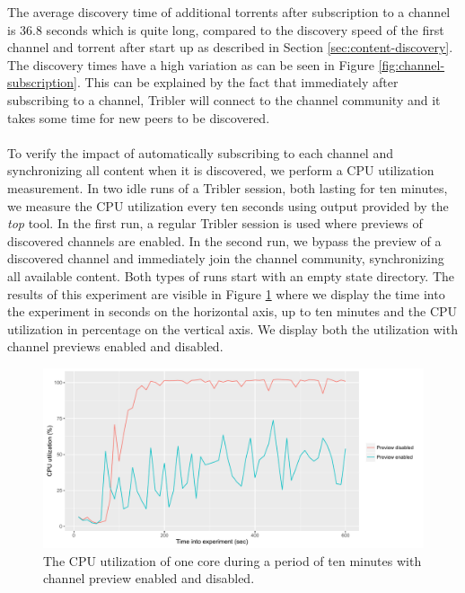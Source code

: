 The average discovery time of additional torrents after subscription to a channel is 36.8 seconds which is quite long, compared to the discovery speed of the first channel and torrent after start up as described in Section \ref{sec:content-discovery}. The discovery times have a high variation as can be seen in Figure \ref{fig:channel-subscription}. This can be explained by the fact that immediately after subscribing to a channel, Tribler will connect to the channel community and it takes some time for new peers to be discovered.\\\\
To verify the impact of automatically subscribing to each channel and synchronizing all content when it is discovered, we perform a CPU utilization measurement. In two idle runs of a Tribler session, both lasting for ten minutes, we measure the CPU utilization every ten seconds using output provided by the \emph{top} tool. In the first run, a regular Tribler session is used where previews of discovered channels are enabled. In the second run, we bypass the preview of a discovered channel and immediately join the channel community, synchronizing all available content. Both types of runs start with an empty state directory. The results of this experiment are visible in Figure \ref{fig:channel-subscription-cpu} where we display the time into the experiment in seconds on the horizontal axis, up to ten minutes and the CPU utilization in percentage on the vertical axis. We display both the utilization with channel previews enabled and disabled.

\begin{figure}[!h]
	\centering
	\includegraphics[width=1.0\columnwidth]{images/experiments/subscribe_cpu_experiment}
	\caption{The CPU utilization of one core during a period of ten minutes with channel preview enabled and disabled.}
	\label{fig:channel-subscription-cpu}
\end{figure}

